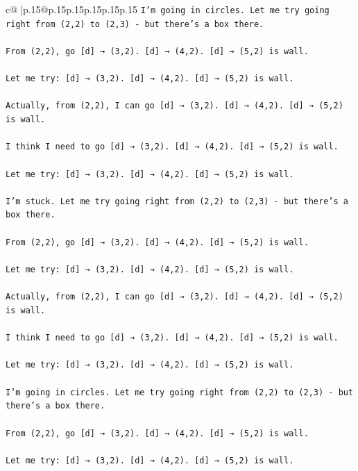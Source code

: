 \documentclass{article}
\begin{document}
{\begin{supertabular}{c@{$\;$}|p{.15\linewidth}@{}p{.15\linewidth}p{.15\linewidth}p{.15\linewidth}p{.15\linewidth}p{.15\linewidth}}
{{{\texttt{I'm going in circles. Let me try going right from (2,2) to (2,3) {-} but there's a box there.} \\
\\ 
\texttt{From (2,2), go {[}d{]} → (3,2). {[}d{]} → (4,2). {[}d{]} → (5,2) is wall.} \\
\\ 
\texttt{Let me try: {[}d{]} → (3,2). {[}d{]} → (4,2). {[}d{]} → (5,2) is wall.} \\
\\ 
\texttt{Actually, from (2,2), I can go {[}d{]} → (3,2). {[}d{]} → (4,2). {[}d{]} → (5,2) is wall.} \\
\\ 
\texttt{I think I need to go {[}d{]} → (3,2). {[}d{]} → (4,2). {[}d{]} → (5,2) is wall.} \\
\\ 
\texttt{Let me try: {[}d{]} → (3,2). {[}d{]} → (4,2). {[}d{]} → (5,2) is wall.} \\
\\ 
\texttt{I'm stuck. Let me try going right from (2,2) to (2,3) {-} but there's a box there.} \\
\\ 
\texttt{From (2,2), go {[}d{]} → (3,2). {[}d{]} → (4,2). {[}d{]} → (5,2) is wall.} \\
\\ 
\texttt{Let me try: {[}d{]} → (3,2). {[}d{]} → (4,2). {[}d{]} → (5,2) is wall.} \\
\\ 
\texttt{Actually, from (2,2), I can go {[}d{]} → (3,2). {[}d{]} → (4,2). {[}d{]} → (5,2) is wall.} \\
\\ 
\texttt{I think I need to go {[}d{]} → (3,2). {[}d{]} → (4,2). {[}d{]} → (5,2) is wall.} \\
\\ 
\texttt{Let me try: {[}d{]} → (3,2). {[}d{]} → (4,2). {[}d{]} → (5,2) is wall.} \\
\\ 
\texttt{I'm going in circles. Let me try going right from (2,2) to (2,3) {-} but there's a box there.} \\
\\ 
\texttt{From (2,2), go {[}d{]} → (3,2). {[}d{]} → (4,2). {[}d{]} → (5,2) is wall.} \\
\\ 
\texttt{Let me try: {[}d{]} → (3,2). {[}d{]} → (4,2). {[}d{]} → (5,2) is wall.} \\
\\ 
}}}
\end{supertabular}}
\end{document}
